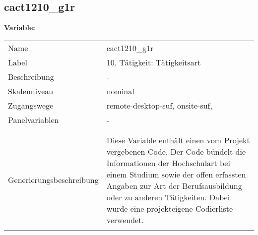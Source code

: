 	
	
	\subsection{cact1210\_g1r}
	\label{subSection:cact1210_g1r}

	\noindent\textbf{Variable:}\\
		\begin{tabular}{lL{11.3cm}}
			\label{tableVariable:cact1210_g1r}
			Name & cact1210\_g1r \\
			Label & 10. Tätigkeit: Tätigkeitsart \\
			Beschreibung & - \\
			Skalenniveau & nominal \\
			Zugangswege &
				remote-desktop-suf,
				onsite-suf,
 \\
			Panelvariablen & -
			 \\
			 \\
 \\
					Generierungsbeschreibung & Diese Variable enthält einen vom Projekt vergebenen Code. Der Code bündelt die  Informationen der Hochschulart bei einem Studium sowie der  offen erfassten Angaben zur Art der Berufsausbildung oder zu anderen Tätigkeiten. Dabei wurde eine projekteigene Codierliste verwendet.
				 \\	
			 \\
		\end{tabular}






